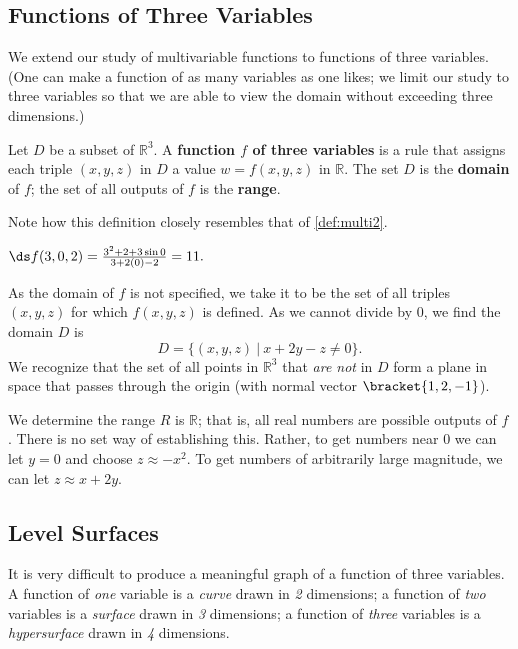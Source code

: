 \subsection*{Functions of Three Variables}

We extend our study of multivariable functions to functions of three variables. (One can make a function of as many variables as one likes; we limit our study to three variables so that we are able to view the domain without exceeding three dimensions.)

{Let $D$ be a subset of $\mathbb{R}^3$. A \textbf{function $f$ of three variables} is a rule that assigns each triple $(x,y,z)$ in $D$ a value $w=f(x,y,z)$ in $\mathbb{R}$. The set $D$ is the \textbf{domain} of $f$; the set of all outputs of $f$ is the \textbf{range}.
}

Note how this definition closely resembles that of \autoref{def:multi2}.

{$\ds f(3,0,2) = \frac{3^2+2+3\sin 0}{3+2(0)-2} = 11.$

As the domain of $f$ is not specified, we take it to be the set of all triples $(x,y,z)$ for which $f(x,y,z)$ is defined. As we cannot divide by $0$, we find the domain $D$ is 
$$D = \{(x,y,z)\ |\ x+2y-z\neq 0\}.$$
We recognize that the set of all points in $\mathbb{R}^3$ that \textit{are not} in $D$ form a plane in space that passes through the origin (with normal vector $\bracket{1,2,-1}$). 

We determine the range $R$ is $\mathbb{R}$; that is, all real numbers are possible outputs of $f$. There is no set way of establishing this. Rather, to get numbers near 0 we can let $y=0$ and choose $z \approx -x^2$. To get numbers of arbitrarily large magnitude, we can let $z\approx x+2y$. }

\subsection*{Level Surfaces}

It is very difficult to produce a meaningful graph of a function of three variables. A function of \textit{one} variable is a \textit{curve} drawn in \textit{2} dimensions; a function of \textit{two} variables is a \textit{surface} drawn in \textit{3} dimensions; a function of \textit{three} variables is a \textit{hypersurface} drawn in \textit{4} dimensions.

